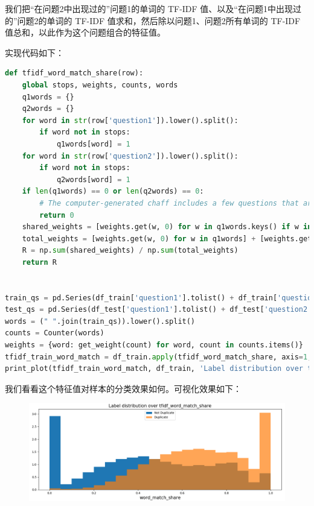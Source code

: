 \documentclass{article}
\begin{document}
我们把“在问题2中出现过的”问题1的单词的 TF-IDF 值、以及“在问题1中出现过的”问题2的单词的 TF-IDF 值求和，然后除以问题1、问题2所有单词的 TF-IDF 值总和，以此作为这个问题组合的特征值。

实现代码如下：

\begin{lstlisting}[language=python]
def tfidf_word_match_share(row):
    global stops, weights, counts, words
    q1words = {}
    q2words = {}
    for word in str(row['question1']).lower().split():
        if word not in stops:
            q1words[word] = 1
    for word in str(row['question2']).lower().split():
        if word not in stops:
            q2words[word] = 1
    if len(q1words) == 0 or len(q2words) == 0:
        # The computer-generated chaff includes a few questions that are nothing but stopwords
        return 0
    shared_weights = [weights.get(w, 0) for w in q1words.keys() if w in q2words] + [weights.get(w, 0) for w in q2words.keys() if w in q1words]
    total_weights = [weights.get(w, 0) for w in q1words] + [weights.get(w, 0) for w in q2words]
    R = np.sum(shared_weights) / np.sum(total_weights)
    return R


train_qs = pd.Series(df_train['question1'].tolist() + df_train['question2'].tolist()).astype(str)
test_qs = pd.Series(df_test['question1'].tolist() + df_test['question2'].tolist()).astype(str)
words = (" ".join(train_qs)).lower().split()
counts = Counter(words)
weights = {word: get_weight(count) for word, count in counts.items()}
tfidf_train_word_match = df_train.apply(tfidf_word_match_share, axis=1, raw=True)
print_plot(tfidf_train_word_match, df_train, 'Label distribution over tfidf_word_match_share', '2.png')
\end{lstlisting}

我们看看这个特征值对样本的分类效果如何。可视化效果如下：

\begin{figure}[!h]
\centering
\includegraphics[scale=0.5]{2.png}
\end{figure}
\end{document}
